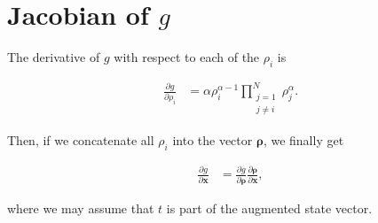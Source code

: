 \documentclass[]{article}
\newcommand{\vb}[1]{\bm{#1}} %
\newcommand{\pd}[2]{\frac{\partial #1}{\partial #2}} %
\begin{document}
\section{Jacobian of $g$}
\label{sec:g_jacobian}

The derivative of $g$ with respect to each of the $\rho_i$ is

\begin{align}
	\pd{g}{\rho_i} &= \alpha \rho_i^{\alpha - 1} \prod_{\substack{j=1 \\ j \neq i}}^{N} \rho_j^\alpha.
\end{align}


Then, if we concatenate all $\rho_i$ into the vector $\vb{\rho}$, we finally get

\begin{align}
	\pd{g}{\vb{x}} &= \pd{g}{\vb{\rho}} \pd{\vb{\rho}}{\vb{x}},
\end{align}

\noindent where we may assume that $t$ is part of the augmented state vector.


%
%
\end{document}
